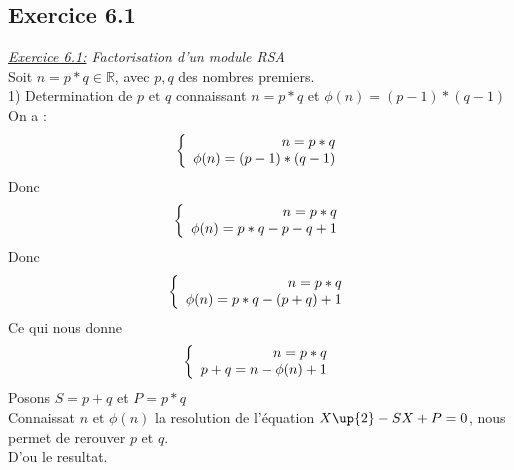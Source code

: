 \documentclass[10pt]{beamer}
\begin{document}
\begin{frame}
\section{Exercice 6.1}
\emph{\underline{Exercice 6.1:} Factorisation d'un module RSA}
\\Soit $n = p*q \in \mathbb{R}$, avec $p, q$ des nombres premiers.
\\1) Determination de $p \text{ et } q$ connaissant $n = p*q$ et $\phi{(n)} = (p-1)*(q-1)$
\\On a :
\[
\left\{
\begin{array}{r c l}
 n = p*q\\
 \phi{(n)} = (p-1)*(q-1)
\end{array}
\right.
\]
Donc 
\[
\left\{
\begin{array}{r c l}
 n = p*q\\
 \phi{(n)} = p*q -p -q +1
\end{array}
\right.
\]
Donc
\[
\left\{
\begin{array}{r c l}
 n = p*q\\
 \phi{(n)} = p*q -(p + q) +1
\end{array}
\right.
\]
Ce qui nous donne
\[
\left\{
\begin{array}{r c l}
 n = p*q\\
 p + q = n- \phi{(n)} +1
\end{array}
\right.
\]
Posons $S = p + q$ et $P = p*q$
\\Connaissat $n \text{ et } \phi{(n)}$ la resolution de l'\'{e}quation $X\up{2} -SX +P = 0$, nous permet de rerouver $p \text{ et } q$.
\\D'ou le resultat.
					
\end{frame}
\end{document}
